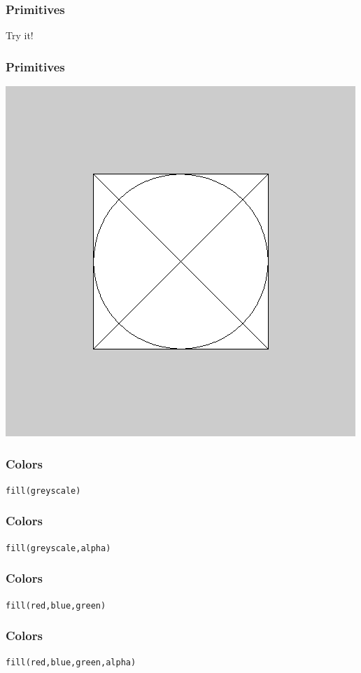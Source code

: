 \documentclass[xcolor=dvipsnames]{beamer}
\begin{document}
\begin{frame}
\frametitle{Primitives}
\begin{center}
Try it!
\end{center}
\end{frame}

\begin{frame}
\frametitle{Primitives}
\begin{center}
\includegraphics[width=0.8\linewidth]{simpleShapes.png}
\end{center}
\end{frame}

\begin{frame}
\frametitle{Colors}
\begin{center}
{\tt fill(greyscale)}
\end{center}
\end{frame}

\begin{frame}
\frametitle{Colors}
\begin{center}
{\tt fill(greyscale,alpha)}
\end{center}
\end{frame}

\begin{frame}
\frametitle{Colors}
\begin{center}
{\tt fill(red,blue,green)}
\end{center}
\end{frame}

\begin{frame}
\frametitle{Colors}
\begin{center}
{\tt fill(red,blue,green,alpha)}
\end{center}
\end{frame}
\end{document}
